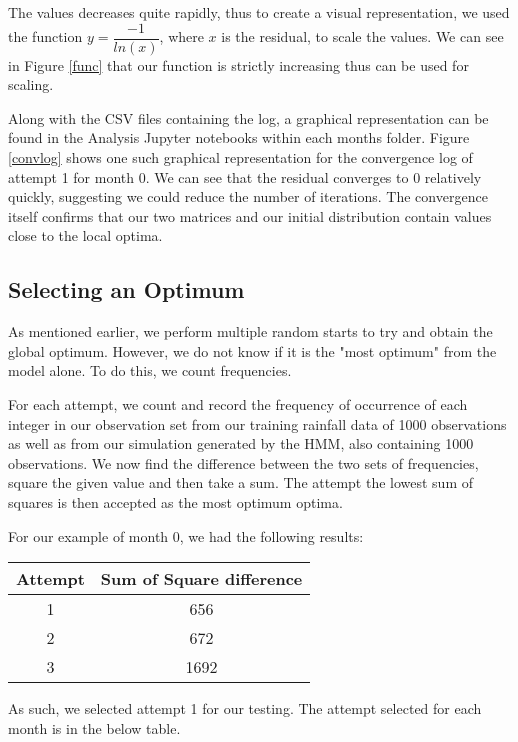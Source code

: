     The values decreases quite rapidly, thus to create a visual representation, we used the function $ y = \dfrac{-1}{ln(x)}$, where $x$ is the residual, to scale the values. We can see in Figure \ref{func} that our function is strictly increasing thus can be used for scaling. 

    Along with the CSV files containing the log, a graphical representation can be found in the Analysis Jupyter notebooks within each months folder. Figure \ref{convlog} shows one such graphical representation for the convergence log of attempt 1 for month 0. We can see that the residual converges to 0 relatively quickly, suggesting we could reduce the number of iterations. The convergence itself confirms that our two matrices and our initial distribution contain values close to the local optima. 

    \subsection{Selecting an Optimum}
    \label{Simple_Rainfall_HMM:Analysis:Selecting_an_Optimum}

    As mentioned earlier, we perform multiple random starts to try and obtain the global optimum. However, we do not know if it is the "most optimum" from the model alone. To do this, we count frequencies. 

    For each attempt, we count and record the frequency of occurrence of each integer in our observation set from our training rainfall data of 1000 observations as well as from our simulation generated by the HMM, also containing 1000 observations. We now find the difference between the two sets of frequencies, square the given value and then take a sum. The attempt the lowest sum of squares is then accepted as the most optimum optima. 

    For our example of month 0, we had the following results:
    \begin{center}
    \begin{tabular}{c | c}
        Attempt & Sum of Square difference \\
        \hline
        1 & 656 \\
        2 & 672 \\
        3 & 1692
    \end{tabular}
    \end{center}

    As such, we selected attempt 1 for our testing. The attempt selected for each month is in the below table.

